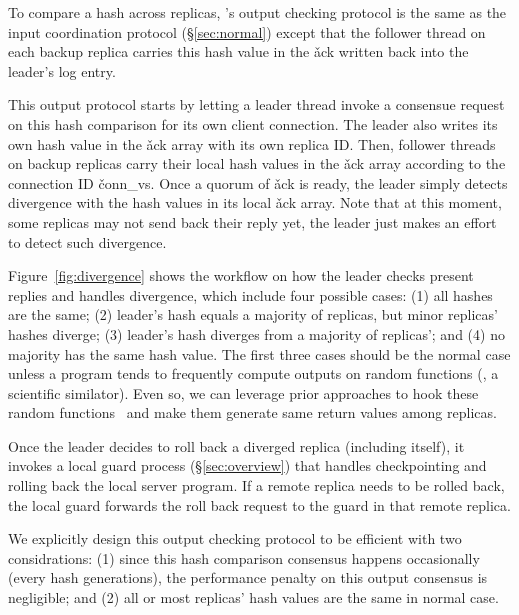 To compare a hash across replicas, \xxx's output checking protocol is the same 
as the input coordination protocol (\S\ref{sec:normal}) except that the 
follower thread on each backup replica carries this hash value in the \v{ack} 
written back into the leader's log entry.

This output protocol starts by letting a leader thread invoke a consensue 
request on this hash comparison for its own client connection. The leader also 
writes its own hash value in the \v{ack} array with its own replica ID. Then, 
follower threads on backup replicas carry their local hash values in the \v{ack} 
array according to the connection ID \v{conn\_vs}. Once a quorum of \v{ack} 
is ready, the leader simply detects divergence with the hash values in its 
local \v{ack} array. Note that at this moment, some replicas may not send back 
their reply yet, the leader just makes an effort to detect such divergence.

Figure~\ref{fig:divergence} shows the workflow on how the leader checks 
present replies and handles divergence, which include four possible cases: 
(1) all hashes are the same; (2) leader's hash equals a majority of replicas, 
but minor replicas' hashes diverge; (3) leader's hash diverges from a majority 
of replicas'; and (4) no majority has the same hash value. The first three 
cases should be the normal case unless a program tends to frequently compute 
outputs on random functions (\eg, a scientific similator). Even so, we can 
leverage prior approaches to hook these 
random functions~\cite{paxos:practical,eve:osdi12} and make them generate same 
return values among replicas.

Once the leader decides to roll back a diverged replica (including itself), it 
invokes a local guard process (\S\ref{sec:overview}) that handles 
checkpointing and rolling back the local server program. If a remote replica 
needs to be rolled back, the local guard forwards the roll back request to the 
guard in that remote replica.

We explicitly design this output checking protocol to be efficient with two 
considrations: (1) since this hash comparison consensus happens occasionally 
(every \thashcomp hash generations), the performance penalty on this output 
consensus is negligible; and (2) all or most replicas' hash values are 
the same in normal case.


